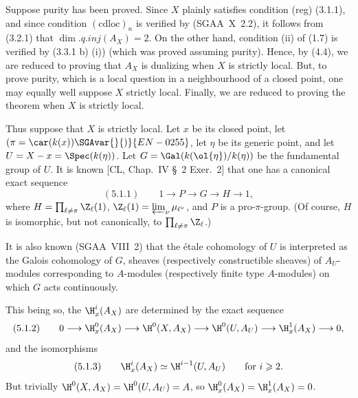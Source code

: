 \begin{prooftext}[Proof]
Suppose purity has been proved. Since $X$ plainly satisfies condition (reg) (3.1.1), and since condition $(\mathrm{cdloc})_n$ is verified by (SGAA~X~2.2), it follows from (3.2.1) that $\dim.q.inj(A_X)=2$. On the other hand, condition (ii) of (1.7) is verified by (3.3.1 b) (i)) (which was proved assuming purity). Hence, by (4.4), we are reduced to proving that $A_X$ is dualizing when $X$ is strictly local. But, to prove purity, which is a local question in a neighbourhood of a closed point, one may equally well suppose $X$ strictly local. Finally, we are reduced to proving the theorem when $X$ is strictly local.

Thus suppose that $X$ is strictly local. Let $x$ be its closed point, let $(\pi=\car(k(x))\SGAvar{}{)}{EN-0255}$, let $\eta$ be its generic point, and let $U=X-x=\Spec(k(\eta))$. Let $G=\Gal(k(\ol{\eta})/k(\eta))$ be the fundamental group of $U$. It is known [CL, Chap.~IV \S~2 Exer.~2] that one has a canonical exact sequence
\[
(5.1.1)\qquad 1\longrightarrow P\longrightarrow G\longrightarrow H\longrightarrow1,
\]
where $H=\prod_{\ell\ne\pi}\Z_\ell(1)$, $\Z_\ell(1)=\varprojlim_{\nu} \mu_{\ell^\nu}$, and $P$ is a pro-$\pi$-group. (Of course, $H$ is isomorphic, but not canonically, to $\prod_{\ell\ne\pi}\Z_\ell$.)

It is also known (SGAA~VIII~2) that the étale cohomology of $U$ is interpreted as the Galois cohomology of $G$, sheaves (respectively constructible sheaves) of $A_U$-modules corresponding to $A$-modules (respectively finite type $A$-modules) on which $G$ acts continuously.

This being so, the $\H_x^i(A_X)$ are determined by the exact sequence
\[
(5.1.2)\qquad 0\longrightarrow \H_x^0(A_X)\longrightarrow \H^0(X,A_X)\longrightarrow \H^0(U,A_U)\longrightarrow \H_x^1(A_X)\longrightarrow0,
\]
and the isomorphisms
\[
(5.1.3)\qquad \H_x^i(A_X)\simeq \H^{i-1}(U,A_U)\qquad\text{for }i\geqslant2.
\]
But trivially $\H^0(X,A_X)=\H^0(U,A_U)=A$, so $\H_x^0(A_X)=\H_x^1(A_X)=0$.


\end{prooftext}
